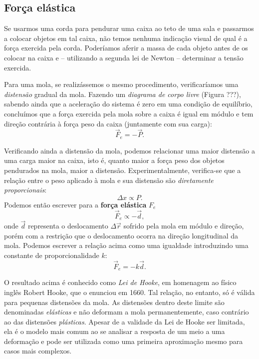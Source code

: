 \subsection{Força elástica}

Se usarmos uma corda para pendurar uma caixa ao teto de uma sala e passarmos a colocar objetos em tal caixa, não temos nenhuma indicação visual de qual é a força exercida pela corda. Poderíamos aferir a massa de cada objeto antes de os colocar na caixa e -- utilizando a segunda lei de Newton -- determinar a tensão exercida.

Para uma mola, se realizássemos o mesmo procedimento, verificaríamos uma \emph{distensão} gradual da mola. Fazendo um \emph{diagrama de corpo livre} (Figura ???), sabendo ainda que a aceleração do sistema é zero em uma condição de equilíbrio, concluímos que a força exercida pela mola sobre a caixa é igual em módulo e tem direção contrária à força peso da caixa (juntamente com sua carga):
\begin{equation}
	\vec{F}_e = -\vec{P}.
\end{equation}


Verificando ainda a distensão da mola, podemos relacionar uma maior distensão a uma carga maior na caixa, isto é, quanto maior a força peso dos objetos pendurados na mola, maior a distensão. Experimentalmente, verifica-se que a relação entre o peso aplicado à mola e sua distensão são \emph{diretamente proporcionais}:
\begin{equation}
	\Delta x \propto P.
\end{equation}
%
Podemos então escrever para a \textbf{força elástica} $F_e$
\begin{equation}
	\vec{F}_e \propto -\vec{d},
\end{equation}
%
onde $\vec{d}$ representa o deslocamento $\Delta \vec{r}$ sofrido pela mola em módulo e direção, porém com a restrição que o deslocamento ocorra na direção longitudinal da mola. Podemos escrever a relação acima como uma igualdade introduzindo uma constante de proporcionalidade $k$:
\begin{equation}
	\vec{F}_e = -k \vec{d}.
\end{equation}

O resultado acima é conhecido como \emph{Lei de Hooke}, em homenagem ao físico inglês Robert Hooke, que o enunciou em 1660. Tal relação, no entanto, só é válida para pequenas distensões da mola. As distensões dentro deste limite são denominadas \emph{elásticas} e não deformam a mola permanentemente, caso contrário ao das distensões \emph{plásticas}. Apesar de a validade da Lei de Hooke ser limitada, ela é o modelo mais comum ao se analisar a resposta de um meio a uma deformação e pode ser utilizada como uma primeira aproximação mesmo para casos mais complexos.

